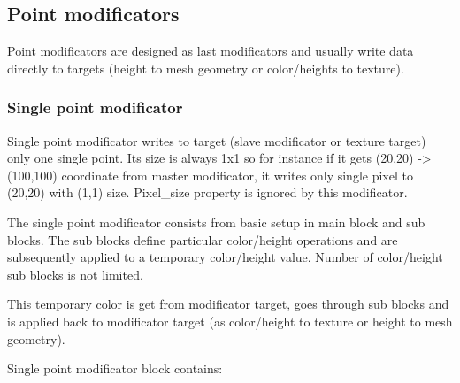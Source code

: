 \documentclass[9pt]{article}
\begin{document}
\subsection{Point modificators}

Point modificators are designed as last modificators and usually write
data directly to targets (height to mesh geometry or color/heights to texture). 

\subsubsection{Single point modificator}

Single point modificator writes to target (slave modificator
or texture target) only one single point. Its size is always 1x1 so for instance
if it gets (20,20) -> (100,100) coordinate from master modificator, it writes
only single pixel to (20,20) with (1,1) size. Pixel\_size property is ignored 
by this modificator.

The single point modificator consists from basic setup in main block and
sub blocks. The sub blocks define particular color/height operations and 
are subsequently applied to a temporary color/height value. Number of 
color/height sub blocks is not limited.

This temporary color is get from modificator target, goes through sub blocks
and is applied back to modificator target (as color/height to texture or
height to mesh geometry). 

Single point modificator block contains:
\end{document}
